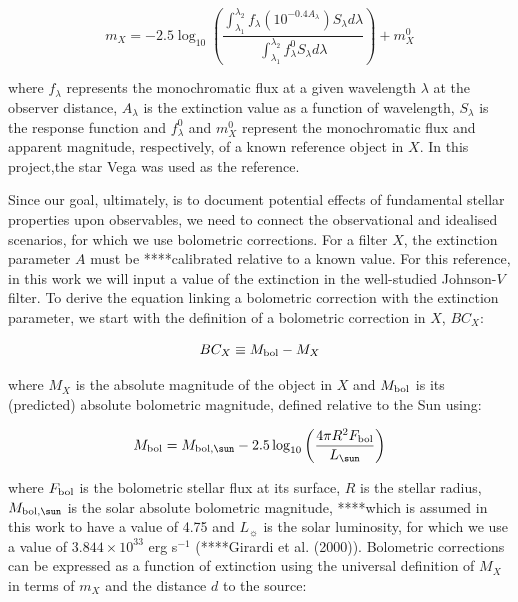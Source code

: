 \documentclass[usenatbib]{mnras}
\begin{document}
\begin{equation}
m_{X} = -2.5 \log_{10} \left(\frac{ \int_{\lambda_{1}}^{\lambda_{2}} f_{\lambda} \left( 10^{-0.4 A_{\lambda}} \right) S_{\lambda} d\lambda }{ \int_{\lambda_{1}}^{\lambda_{2}} f_{\lambda}^{0} S_{\lambda} d\lambda }\right) + m_{X}^{0}
\label{app_mag_def}
\end{equation}

where $f_{\lambda}$ represents the monochromatic flux at a given wavelength $\lambda$ at the observer distance, $A_{\lambda}$ is the extinction value as a function of wavelength, $S_{\lambda}$ is the response function and $f_{\lambda}^{0}$ and $m_{X}^{0}$ represent the monochromatic flux and apparent magnitude, respectively, of a known reference object in $X$. In this project,the star Vega was used as the reference.

Since our goal, ultimately, is to document potential effects of fundamental stellar properties upon observables, we need to connect the observational and idealised scenarios, for which we use bolometric corrections. For a filter $X$, the extinction parameter $A$ must be ****calibrated relative to a known value. For this reference, in this work we will input a value of the extinction in the well-studied Johnson-$V$ filter.
To derive the equation linking a bolometric correction with the extinction parameter, we start with the definition of a bolometric correction in $X$, $BC_{X}$:

\begin{equation}
BC_{X} \equiv M_{\textnormal{bol}} - M_{X}
\label{BC_def}
\end{equation}

where $M_{X}$ is the absolute magnitude of the object in $X$ and $M_{\textnormal{bol}}$ is its (predicted) absolute bolometric magnitude, defined relative to the Sun using:

\begin{equation}
M_{\textnormal{bol}} = M_{\textnormal{bol},\sun} - 2.5 \log_{10} \left( \frac{4\pi R^{2}F_{\textnormal{bol}}}{L_{\sun}} \right)
\label{mbol_sun}
\end{equation}

where  $F_{\textnormal{bol}}$ is the bolometric stellar flux at its surface, $R$ is the stellar radius, $M_{\textnormal{bol},\sun}$ is the solar absolute bolometric magnitude, ****which is assumed in this work to have a value of 4.75 and $L_{\sun}$ is the solar luminosity, for which we use a value of $3.844 \times 10^{33}$ erg s$^{-1}$ (****Girardi et al. (2000)). Bolometric corrections can be expressed as a function of extinction using the universal definition of $M_{X}$ in terms of $m_{X}$ and the distance $d$ to the source:
\end{document}
